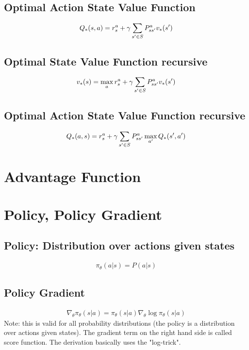 \subsection{Optimal Action State Value Function}
\begin{align}
	Q_{*}(s, a) = r_s^a + \gamma \sum_{s' \in S} P_{ss'}^a v_{*} (s')
\end{align}
\subsection{Optimal State Value Function recursive}
\begin{align}
	v_{*} (s) = \max\limits_a r_s^a + \gamma \sum_{s' \in S} P_{ss'}^a v_{*} (s')
\end{align}
\subsection{Optimal Action State Value Function recursive}
\begin{align}
	Q_{*}(a, s) = r_s^a + \gamma \sum_{s' \in S} P_{ss'}^a \max\limits_{a'} Q_{*}(s', a')
\end{align}


\section{Advantage Function}



\section{Policy, Policy Gradient}

\subsection{Policy: Distribution over actions given states}
\renewcommand{\policy}[2]{\pi_\theta (#1 | #2)}
\begin{align}
	\policy{a}{s} = P(a | s)
\end{align}
\subsection{Policy Gradient}
\begin{align}
	\nabla_\theta \policy{s}{a} = \policy{s}{a} \nabla_\theta \log \policy{s}{a}
\end{align}
Note: this is valid for all probability distributions (the policy is a distribution over actions given states). The gradient term on the right hand side is called score function. The derivation basically uses the "log-trick".


